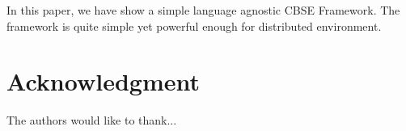 \documentclass[conference]{IEEEtran}
\begin{document}
In this paper, we have show a simple language agnostic CBSE Framework. The framework
is quite simple yet powerful enough for distributed environment.


\section*{Acknowledgment}
The authors would like to thank...

\ifCLASSOPTIONcaptionsoff
  \newpage
\fi




\end{document}
